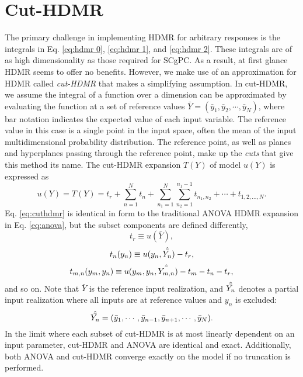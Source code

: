 \section{Cut-HDMR}\label{sec:cuthdmr}
The primary challenge in implementing HDMR for arbitrary responses is the integrals in Eq. \ref{eq:hdmr 0},
\ref{eq:hdmr 1}, and \ref{eq:hdmr 2}.  These integrals are of as high dimensionality as those required for
SCgPC.  As a result, at first glance HDMR seems to offer no benefits.  However,
we make use of an approximation for HDMR called \emph{cut-HDMR} \cite{cutHDMR} that makes a simplifying assumption.
In cut-HDMR, we assume the integral of a function over a dimension can be approximated by evaluating the
function at a set of reference values $\bar Y = (\bar y_1,\bar y_2,\cdots,\bar y_N)$, where bar notation
indicates the expected value of each input variable.  The reference value in this case
is a single point in the input space, often the mean of the input multidimensional probability distribution.  The
reference point, as well as planes and hyperplanes passing through the reference point, make up the
\emph{cuts} that give this method its name.  The cut-HDMR expansion $T(Y)$ of model $u(Y)$ is expressed as
\begin{equation}\label{eq:cuthdmr}
  u(Y) = T(Y) = t_r + \sum_{n=1}^N t_n + \sum_{n_1=1}^N \sum_{n_2=1}^{n_1-1}
  t_{n_1,n_2}+\cdots+t_{1,2,\ldots,N}.
\end{equation}
Eq. \ref{eq:cuthdmr} is identical in form to the traditional ANOVA HDMR expansion in Eq. \ref{eq:anova}, but the subset components
are defined differently,
\begin{equation}
  t_r \equiv u(\bar Y),
\end{equation}
\begin{equation}
  t_n(y_n) \equiv u(y_n,\hat{\bar{{Y_n}}}) - t_r,
\end{equation}
\begin{equation}
  t_{m,n}(y_m,y_n) \equiv u(y_m,y_n,\hat{\bar{{Y_{m,n}}}}) - t_m - t_n - t_r,
\end{equation}
and so on. Note that $\bar Y$ is the reference input realization, and 
$\hat{\bar{{Y_n}}}$ denotes a partial input realization where all inputs are at reference values and $y_n$ is
excluded:
\begin{equation}
  \hat{\bar{{Y_n}}} = (\bar y_1,\cdots,\bar y_{n-1},\bar y_{n+1},\cdots,\bar y_N).
\end{equation}
In the limit where each subset of cut-HDMR is at most linearly dependent on an input parameter, cut-HDMR and
ANOVA are identical and exact.  Additionally, both ANOVA and cut-HDMR converge exactly on the model if no
truncation is performed.

